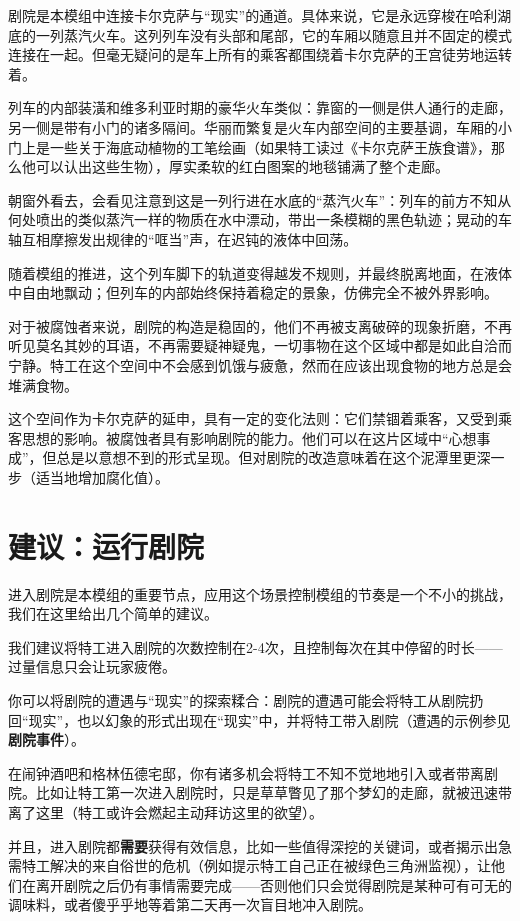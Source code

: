 剧院是本模组中连接卡尔克萨与“现实”的通道。具体来说，它是永远穿梭在哈利湖底的一列蒸汽火车。这列列车没有头部和尾部，它的车厢以随意且并不固定的模式连接在一起。但毫无疑问的是车上所有的乘客都围绕着卡尔克萨的王宫徒劳地运转着。

列车的内部装潢和维多利亚时期的豪华火车类似：靠窗的一侧是供人通行的走廊，另一侧是带有小门的诸多隔间。华丽而繁复是火车内部空间的主要基调，车厢的小门上是一些关于海底动植物的工笔绘画（如果特工读过《卡尔克萨王族食谱》，那么他可以认出这些生物），厚实柔软的红白图案的地毯铺满了整个走廊。

朝窗外看去，会看见注意到这是一列行进在水底的“蒸汽火车”：列车的前方不知从何处喷出的类似蒸汽一样的物质在水中漂动，带出一条模糊的黑色轨迹；晃动的车轴互相摩擦发出规律的“哐当”声，在迟钝的液体中回荡。

随着模组的推进，这个列车脚下的轨道变得越发不规则，并最终脱离地面，在液体中自由地飘动；但列车的内部始终保持着稳定的景象，仿佛完全不被外界影响。

对于被腐蚀者来说，剧院的构造是稳固的，他们不再被支离破碎的现象折磨，不再听见莫名其妙的耳语，不再需要疑神疑鬼，一切事物在这个区域中都是如此自洽而宁静。特工在这个空间中不会感到饥饿与疲惫，然而在应该出现食物的地方总是会堆满食物。

这个空间作为卡尔克萨的延申，具有一定的变化法则：它们禁锢着乘客，又受到乘客思想的影响。被腐蚀者具有影响剧院的能力。他们可以在这片区域中“心想事成”，但总是以意想不到的形式呈现。但对剧院的改造意味着在这个泥潭里更深一步（适当地增加腐化值）。

\section{建议：运行剧院}
进入剧院是本模组的重要节点，应用这个场景控制模组的节奏是一个不小的挑战，我们在这里给出几个简单的建议。

我们建议将特工进入剧院的次数控制在2-4次，且控制每次在其中停留的时长——过量信息只会让玩家疲倦。

你可以将剧院的遭遇与“现实”的探索糅合：剧院的遭遇可能会将特工从剧院扔回“现实”，也以幻象的形式出现在“现实”中，并将特工带入剧院（遭遇的示例参见\textbf{剧院事件}）。

在闹钟酒吧和格林伍德宅邸，你有诸多机会将特工不知不觉地地引入或者带离剧院。比如让特工第一次进入剧院时，只是草草瞥见了那个梦幻的走廊，就被迅速带离了这里（特工或许会燃起主动拜访这里的欲望）。

并且，进入剧院都\textbf{需要}获得有效信息，比如一些值得深挖的关键词，或者揭示出急需特工解决的来自俗世的危机（例如提示特工自己正在被绿色三角洲监视），让他们在离开剧院之后仍有事情需要完成——否则他们只会觉得剧院是某种可有可无的调味料，或者傻乎乎地等着第二天再一次盲目地冲入剧院。

